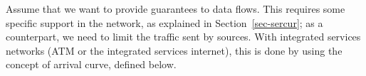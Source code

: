 Assume that we want to provide guarantees to data flows. This
requires some specific support in the network, as explained in
Section~\ref{sec-sercur}; as a counterpart, we need to limit the
traffic sent by sources. With integrated services networks (ATM or
the integrated services internet), this is done by using the
concept of arrival curve, defined below.

%
%
%
%
